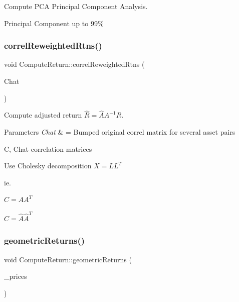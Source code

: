 Compute P\+CA Principal Component Analysis. 

Principal Component up to 99\% \hypertarget{classComputeReturn_a4d0b2d72a0fab11c03eb3e09f089a4b9}{}\label{classComputeReturn_a4d0b2d72a0fab11c03eb3e09f089a4b9} 
\subsubsection{\texorpdfstring{correl\+Reweighted\+Rtns()}{correlReweightedRtns()}}
{\footnotesize\ttfamily void Compute\+Return\+::correl\+Reweighted\+Rtns (\begin{DoxyParamCaption}\item[{const Eigen\+::\+Matrix\+Xd \&}]{Chat }\end{DoxyParamCaption})}



Compute adjusted return $ \hat{R}= \hat{A} A^{-1} R$. 


\begin{DoxyParams}{Parameters}
{\em Chat} & = Bumped original correl matrix for several asset pairs\\
\hline
\end{DoxyParams}
C, Chat correlation matrices

Use Cholesky decomposition $X = LL^T$

ie.

$C = AA^T$

$ \hat{C} = \hat{A} \hat{A} ^{T}$ \hypertarget{classComputeReturn_a6c7c54511bec213c7359e041ec469e78}{}\label{classComputeReturn_a6c7c54511bec213c7359e041ec469e78} 
\subsubsection{\texorpdfstring{geometric\+Returns()}{geometricReturns()}\hspace{0.1cm}{\footnotesize\ttfamily [1/2]}}
{\footnotesize\ttfamily void Compute\+Return\+::geometric\+Returns (\begin{DoxyParamCaption}\item[{const \hyperlink{compute__returns__eigen_8h_a1eb6a9306ef406d7975f3cbf2e247777}{Vec} \&}]{\+\_\+prices }\end{DoxyParamCaption})}



